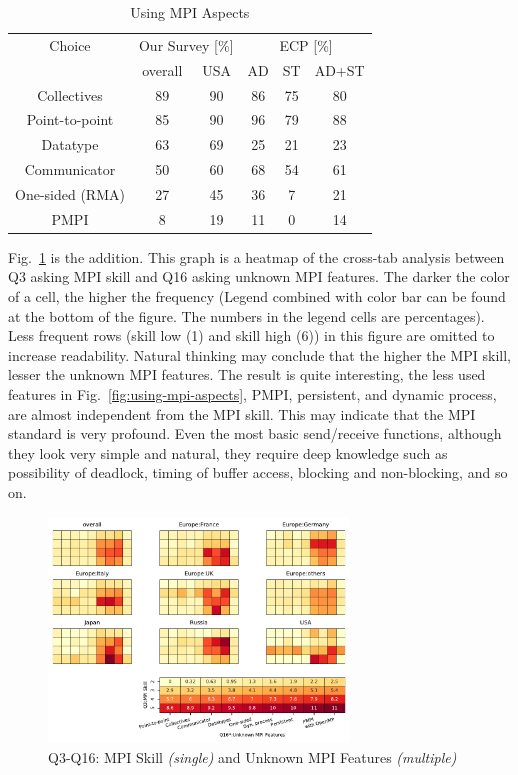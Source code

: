 \documentclass[conference,10pt,letterpaper]{IEEEtran}
\begin{document}
\begin{table}[htb]%
  \begin{center}%
    \caption{Using MPI Aspects}\label{tab:using-mpi-aspects}%
    \begin{tabular}{c||c|c||c|c|c}%
      \hline%
      Choice & \multicolumn{2}{c||}{Our Survey [\%]} &
      \multicolumn{3}{c}{ECP [\%]} \\
      \cline{2-6}%
      & overall & USA & AD & ST & AD+ST \\
      \hline%
      Collectives & 89 & 90 & 86 & 75 & 80 \\
      Point-to-point & 85 & 90 & 96 & 79 & 88 \\
      Datatype & 63 & 69 & 25 & 21 & 23 \\
      Communicator & 50 & 60 & 68 & 54 & 61 \\
      One-sided (RMA) & 27 & 45 & 36 & 7 & 21 \\
      PMPI & 8 & 19 & 11 & 0 & 14 \\
      \hline%
    \end{tabular}%
  \end{center}%
\end{table}%

Fig.~\ref{fig:skill-and-aspects} is the addition. This graph is a
heatmap of the cross-tab analysis between Q3 asking MPI skill and Q16
asking unknown MPI features. The darker the color of a cell, the
higher the frequency (Legend combined with color bar can be found at
the bottom of the figure. The numbers in the legend cells are
percentages). Less frequent 
rows (skill low (1) and skill high (6)) in this figure are
omitted to increase readability. Natural thinking may conclude 
that the higher the MPI skill, lesser the unknown MPI features. The
result is quite interesting, the less used features in
Fig.~\ref{fig:using-mpi-aspects}, PMPI, persistent, and dynamic
process, are almost independent from the MPI skill. This may indicate
that the MPI standard is very profound. Even the most basic
send/receive functions, although they look very simple and natural,
they require deep knowledge such as possibility of deadlock, timing of
buffer access, blocking and non-blocking, and so on.

\begin{figure}[htb]
  \begin{center}
    \includegraphics[width=8cm]{Figs/Q3-Q16.pdf}
    \caption{Q3-Q16: MPI Skill {\it(single)} and Unknown MPI Features {\it(multiple)}}
    \label{fig:skill-and-aspects}
  \end{center}
\end{figure}
\end{document}
